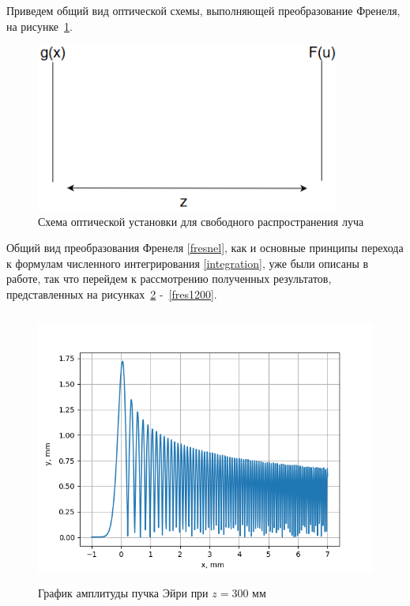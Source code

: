 {    Приведем общий вид оптической схемы, выполняющей преобразование Френеля, на рисунке~\ref{fres_sys}.
    \begin{figure}[H]
        \begin{center}
            \includegraphics[width=10cm]{plots/fres_sys}
            \caption{Схема оптической установки для свободного распространения луча}
            \label{fres_sys}
        \end{center}
    \end{figure}

    Общий вид преобразования Френеля \eqref{fresnel}, как и основные принципы перехода к формулам численного интегрирования \eqref{integration},
    уже были описаны в работе, так что перейдем к рассмотрению полученных результатов,
    представленных на рисунках~\ref{fres300} -~\ref{fres1200}.

    \begin{figure}[H]
        \centering
        \includegraphics[height = 9cm]{plots/fres300.png}
        \caption{График амплитуды пучка Эйри при $z = 300$ мм}
        \label{fres300}
    \end{figure}

}
